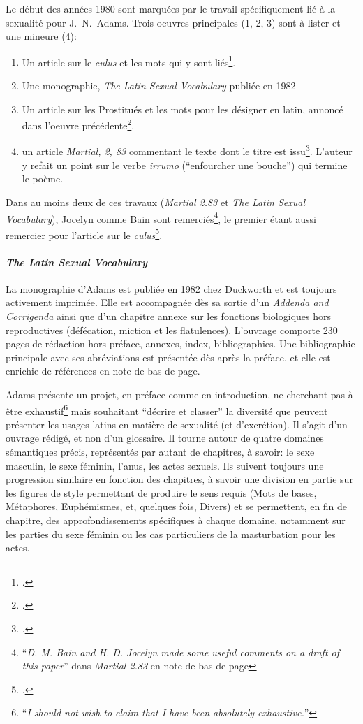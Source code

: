 Le début des années 1980 sont marquées par le travail spécifiquement lié à la sexualité pour J.~N.~Adams. Trois oeuvres principales (1, 2, 3) sont à lister et une mineure (4):
\begin{enumerate}
    \item Un article sur le \textit{culus} et les mots qui y sont liés\footcite{adams_culus_1981}.
    \item Une monographie, \textit{The Latin Sexual Vocabulary} publiée en 1982
    \item Un article sur les Prostitués et les mots pour les désigner en latin, annoncé dans l'oeuvre précédente\footcite{adams_words_1983}.
    \item un article \textit{Martial, 2, 83} commentant le texte dont le titre est issu\footcite{adams_martial_1983}. L'auteur y refait un point sur le verbe \textit{irrumo} (\enquote{enfourcher une bouche}) qui termine le poème.
\end{enumerate}
Dans au moins deux de ces travaux (\textit{Martial 2.83} et \textit{The Latin Sexual Vocabulary}), Jocelyn comme Bain sont remerciés\footnote{\enquote{\textit{D. M. Bain and H. D. Jocelyn made some useful comments on a draft of this paper}} dans \textit{Martial 2.83} en note de bas de page}, le premier étant aussi remercier pour l'article sur le \textit{culus}\footcite[p.~264]{adams_culus_1981}. 

\paragraph{\textit{The Latin Sexual Vocabulary}}

La monographie d'Adams est publiée en 1982 chez Duckworth et est toujours activement imprimée. Elle est accompagnée dès sa sortie d'un \textit{Addenda and Corrigenda} ainsi que d'un chapitre annexe sur les fonctions biologiques hors reproductives (défécation, miction et les flatulences). L'ouvrage comporte 230 pages de rédaction hors préface, annexes, index, bibliographies. Une bibliographie principale avec ses abréviations est présentée dès après la préface, et elle est enrichie de références en note de bas de page.

Adams présente un projet, en préface comme en introduction, ne cherchant pas à être exhaustif\footnote{\enquote{\textit{I should
not wish to claim that I have been absolutely exhaustive.}}\textcite[Preface, p.~1]{adams}} mais souhaitant \enquote{décrire et classer} la diversité que peuvent présenter les usages latins en matière de sexualité (et d'excrétion). Il s'agit d'un ouvrage rédigé, et non d'un glossaire. Il tourne autour de quatre domaines sémantiques précis, représentés par autant de chapitres, à savoir: le sexe masculin, le sexe féminin, l'anus, les actes sexuels. Ils suivent toujours une progression similaire en fonction des chapitres, à savoir une division en partie sur les figures de style permettant de produire le sens requis (Mots de bases, Métaphores, Euphémismes, et, quelques fois, Divers) et se permettent, en fin de chapitre, des approfondissements spécifiques à chaque domaine, notamment sur les parties du sexe féminin ou les cas particuliers de la masturbation pour les actes.

